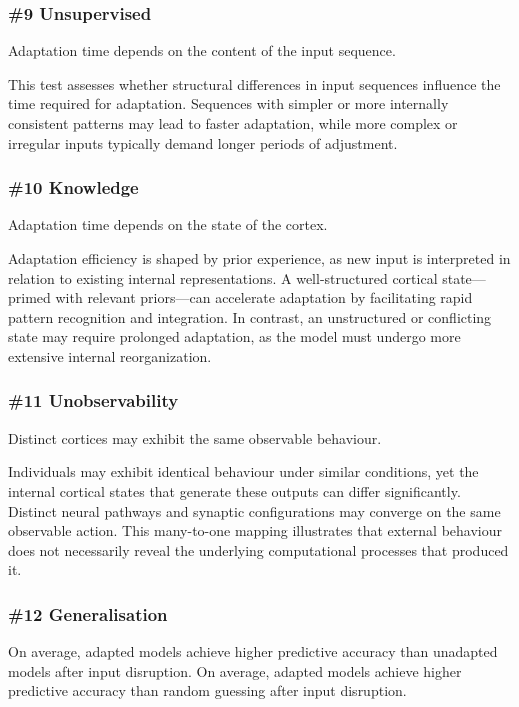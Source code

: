 \documentclass{article}
\newenvironment{one_assertion}[1]
{
  \begin{tabular}{p{1.5cm}p{8.2cm}}
    \textbf{Assertion:} & #1 \\
}{
  \end{tabular}\\
}
\newenvironment{two_assertions}[2]
{
  \begin{tabular}{p{1.5cm}p{8.2cm}}
    \textbf{Assertion:} & #1 \\
    \textbf{Assertion:} & #2 \\
}{
  \end{tabular}\\
}
\begin{document}
\subsubsection*{\#9 Unsupervised}
\begin{one_assertion}
    {Adaptation time depends on the content of the input sequence.}
\end{one_assertion}

This test assesses whether structural differences in input sequences influence the time required for adaptation. Sequences with simpler or more internally consistent patterns may lead to faster adaptation, while more complex or irregular inputs typically demand longer periods of adjustment.

\subsubsection*{\#10 Knowledge}
\begin{one_assertion}
{Adaptation time depends on the state of the cortex.}
\end{one_assertion}

Adaptation efficiency is shaped by prior experience, as new input is interpreted in relation to existing internal representations. A well-structured cortical state—primed with relevant priors—can accelerate adaptation by facilitating rapid pattern recognition and integration. In contrast, an unstructured or conflicting state may require prolonged adaptation, as the model must undergo more extensive internal reorganization.

\subsubsection*{\#11 Unobservability}
\begin{one_assertion}
    {Distinct cortices may exhibit the same observable behaviour.}
\end{one_assertion}

Individuals may exhibit identical behaviour under similar conditions, yet the internal cortical states that generate these outputs can differ significantly. Distinct neural pathways and synaptic configurations may converge on the same observable action. This many-to-one mapping illustrates that external behaviour does not necessarily reveal the underlying computational processes that produced it.

\subsubsection*{\#12 Generalisation}
\begin{two_assertions}
    {On average, adapted models achieve higher predictive accuracy than unadapted models after input disruption.}
    {On average, adapted models achieve higher predictive accuracy than random guessing after input disruption.}
\end{two_assertions}
\end{document}

